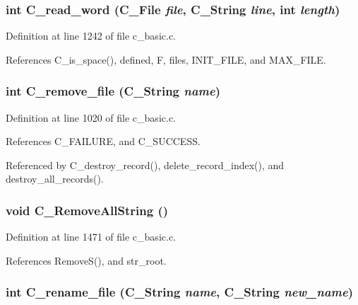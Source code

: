 \subsubsection{\setlength{\rightskip}{0pt plus 5cm}int C\_\-read\_\-word (\bf{C\_\-File} {\em file}, \bf{C\_\-String} {\em line}, int {\em length})}\label{c__basic_8h_f146bfd3866a4f5a63d97711a8bf08d2}




Definition at line 1242 of file c\_\-basic.c.

References C\_\-is\_\-space(), defined, F, files, INIT\_\-FILE, and MAX\_\-FILE.
\subsubsection{\setlength{\rightskip}{0pt plus 5cm}int C\_\-remove\_\-file (\bf{C\_\-String} {\em name})}\label{c__basic_8h_e0b7cbaae88d990dfe025889b802b53f}




Definition at line 1020 of file c\_\-basic.c.

References C\_\-FAILURE, and C\_\-SUCCESS.

Referenced by C\_\-destroy\_\-record(), delete\_\-record\_\-index(), and destroy\_\-all\_\-records().
\subsubsection{\setlength{\rightskip}{0pt plus 5cm}void C\_\-Remove\-All\-String ()}\label{c__basic_8h_e7b53fe3522ac7645bca8c64d3f5b6b0}




Definition at line 1471 of file c\_\-basic.c.

References Remove\-S(), and str\_\-root.
\subsubsection{\setlength{\rightskip}{0pt plus 5cm}int C\_\-rename\_\-file (\bf{C\_\-String} {\em name}, \bf{C\_\-String} {\em new\_\-name})}\label{c__basic_8h_baf27e269e0c0e41339aa204019da059}





